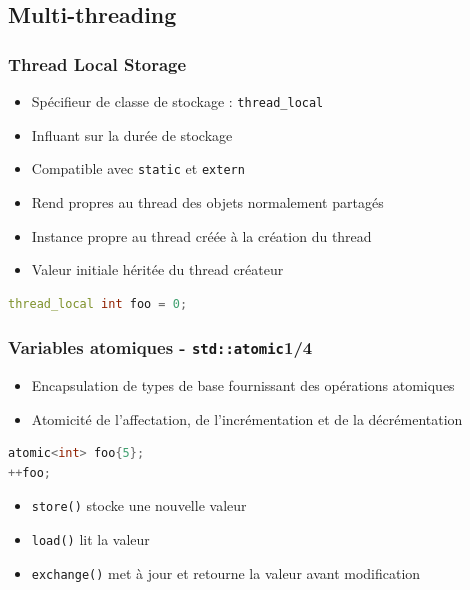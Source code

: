 \documentclass[C++.tex]{subfiles}
\begin{document}
\subsection*{Multi-threading}
\begin{frame}[fragile]
	\frametitle{Thread Local Storage}
	\begin{itemize}
		\item Spécifieur de classe de stockage : \lstinline|thread_local|
		\item Influant sur la durée de stockage
		\item Compatible avec \lstinline|static| et \lstinline|extern|
		\item Rend propres au thread des objets normalement partagés


		\item Instance propre au thread créée à la création du thread
		\item Valeur initiale héritée du thread créateur
	\end{itemize}

	\begin{lstlisting}[language=C++]
thread_local int foo = 0;\end{lstlisting}
\end{frame}

\begin{frame}[fragile]
	\frametitle{Variables atomiques - \lstinline|std::atomic|\titlehfill{}1/4}
	\begin{itemize}
		\item Encapsulation de types de base fournissant des opérations atomiques
		\item Atomicité de l'affectation, de l'incrémentation et de la décrémentation
	\end{itemize}

	\begin{lstlisting}[language=C++]
atomic<int> foo{5};
++foo; \end{lstlisting}

	\begin{itemize}
		\item \lstinline|store()| stocke une nouvelle valeur
		\item \lstinline|load()| lit la valeur
		\item \lstinline|exchange()| met à jour et retourne la valeur avant modification
	\end{itemize}
\end{frame}
\end{document}

